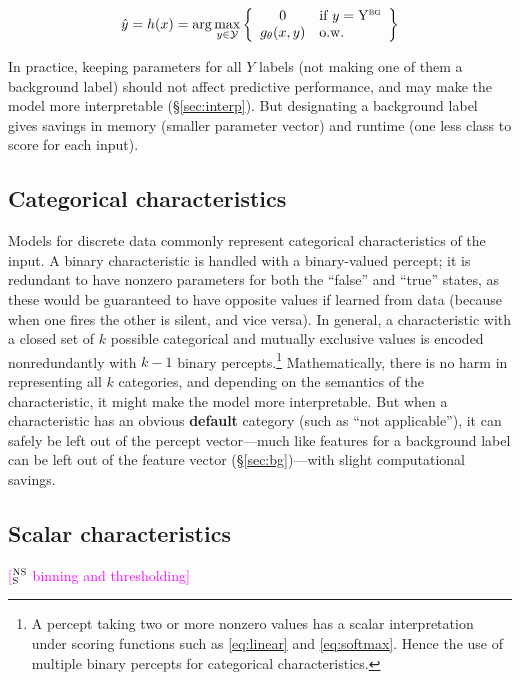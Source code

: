 \documentclass[11pt,letterpaper]{article}
\newcommand{\ensuretext}[1]{#1}
\newcommand{\nssmarker}{\ensuretext{\textcolor{magenta}{\ensuremath{^{\textsc{NS}}_{\textsc{S}}}}}}
\newcommand{\arkcomment}[3]{\ensuretext{\textcolor{#3}{[#1 #2]}}}
\newcommand{\nss}[1]{\arkcomment{\nssmarker}{#1}{magenta}}
\newcommand{\params}{\mathbf{\theta}}
\newcommand{\Sref}[1]{\S\ref{#1}}
\newcommand{\eref}[1]{\eqref{#1}}
\begin{document}
\begin{equation}\label{eq:classifier-bg}
\hat{y} = h(x) = \arg\max_{y\in\mathcal{Y}} \left\{\begin{array}{cl}
0 & \text{if }y=\mathrm{Y}^{\textsc{bg}} \\
g_\params(x,y) & \text{o.w.}\end{array}\right\}
\end{equation}

In practice, keeping parameters for all $Y$ labels (not making one of them a background label) 
should not affect predictive performance, and may make the model more interpretable (\Sref{sec:interp}).
But designating a background label gives savings in memory (smaller parameter vector) and runtime (one less class to score for each input).

\subsection{Categorical characteristics}

Models for discrete data commonly represent categorical characteristics of the input.
A binary characteristic is handled with a binary-valued percept; it is redundant to have 
nonzero parameters for both the ``false'' and ``true'' states, as these would be guaranteed 
to have opposite values if learned from data (because when one fires the other is silent, and vice versa).
In general, a characteristic with a closed set of $k$ possible categorical and mutually exclusive values 
is encoded nonredundantly with $k-1$ binary percepts.\footnote{A percept taking two or more nonzero values has a scalar 
interpretation under scoring functions such as \eref{eq:linear} and \eref{eq:softmax}. 
Hence the use of multiple binary percepts for categorical characteristics.}
Mathematically, there is no harm in representing all $k$ categories, 
and depending on the semantics of the characteristic, it might make the model more interpretable.
But when a characteristic has an obvious {\bf default} category (such as ``not applicable''),
it can safely be left out of the percept vector---much like features for a background label 
can be left out of the feature vector (\Sref{sec:bg})---with slight computational savings.

\subsection{Scalar characteristics}

\nss{binning and thresholding}
\end{document}
